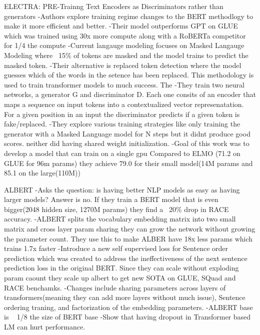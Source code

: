 ELECTRA: PRE-Trainng Text Encoders as Discriminators rather than generators
-Authors explore training regime changes to the BERT methodlogy to make it more efficient and better. 
-Their model outperforms GPT on GLUE which was trained using 30x more compute along with a RoBERTa competitor for 1/4 the compute 
-Current langauge modeling focuses on Masked Langauge Modeling where ~15\% of tokens are masked and the model trains to predict the masked token. 
-Their alternative is replaced token detection where the model guesses which of the words in the setence has been replaced. This methodology is used to train transformer models to much success. The
-They train two neural networks, a generator G and discriminator D. Each one consits of an encoder that maps a sequence on input tokens into a contextualized vector represenatation. For a given position in an input the discriminator predicts if a given token is fake/replaced. 
-They explore various training strategies like only training the generator with a Masked Language model for N steps but it didnt produce good scores.  neither did having shared weight initialization. 
-Goal of this work was to develop a model that can train on a single gpu 
Compared to ELMO (71.2 on GLUE  for 96m params) they achieve 79.0 for their small model(14M params and 85.1 on the large(110M))

ALBERT
-Asks the question: is having better NLP models as easy as having larger models? Answer is no. If they train a BERT model that is even bigger(2048 hidden size, 1270M params) they find a ~20\% drop in RACE accuracy.
-ALBERT splits the vocabulary embedding matrix into two small matrix and cross layer param sharing they can grow the network without growing the parameter count. They use this to make ALBER have 18x less params  which trains 1.7x faster
-Introduce a new self supervised loss for Sentence order prediction which was created to address the ineffectiveness of the next sentence prediction loss in the original BERT. Since they can scale without exploding param caount they scale up albert to get new SOTA on GLUE, SQuad and RACE benchamks. 
-Changes include sharing parameters across layers of transformers(meaning they can add more layers without much issue), Sentence ordering traning, and factorization of the embedding parameters.
-ALBERT base is ~ 1/8 the size of BERT base
-Show that having dropout in Transformer based LM can hurt performance.
\fi